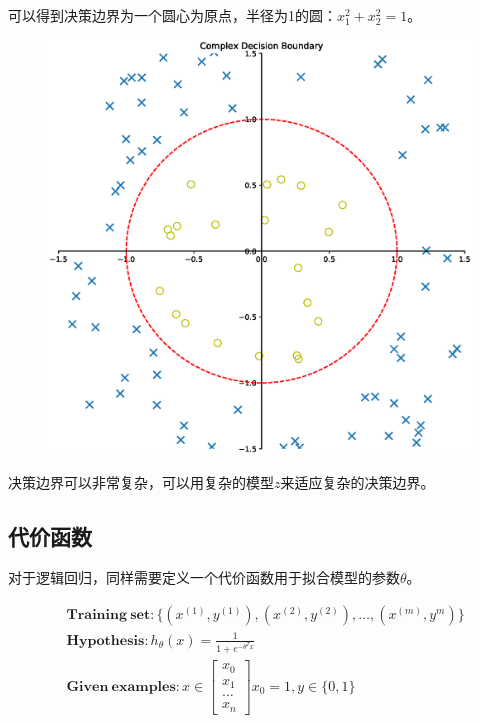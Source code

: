 \documentclass[12pt, a4paper]{article}
\begin{document}
可以得到决策边界为一个圆心为原点，半径为1的圆：$x_1^2+x_2^2=1$。

\begin{figure}[H]
    \includegraphics[width=1\textwidth]{ComplexDecisionBoundary.eps}
\end{figure}

决策边界可以非常复杂，可以用复杂的模型$z$来适应复杂的决策边界。

\subsection{代价函数}

对于逻辑回归，同样需要定义一个代价函数用于拟合模型的参数$\theta$。

\begin{align*}
     & \mathbf{Training\ set}: \{(x^{(1)}, y^{(1)}), (x^{(2)}, y^{(2)}), \dots, (x^{(m)}, y^{m})\} \\
     & \mathbf{Hypothesis}: h_\theta(x)=\frac{1}{1+e^{-\theta^Tx}}                                 \\
     & \mathbf{Given\ examples}: x\in\left[
        \begin{matrix}
            x_0   \\
            x_1   \\
            \dots \\
            x_n
        \end{matrix}
        \right] x_0=1, y\in\{0, 1\}
\end{align*}
\end{document}
